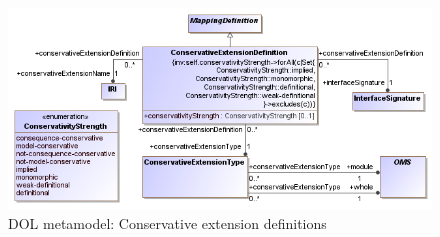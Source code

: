 \documentclass[10pt, a4paper]{isov2}
\begin{document}
\begin{figure}
  \centering
    \includegraphics[scale=0.47]{mof/modules.png}
  \caption{DOL metamodel: Conservative extension definitions}
  \label{fig:modules}
\end{figure}



\label{a:dol-text:mappings}
\end{document}
